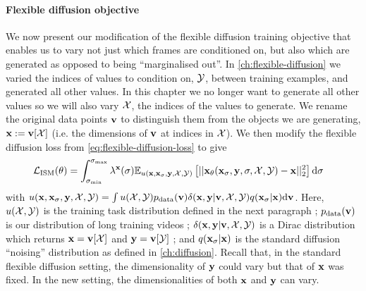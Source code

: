 \paragraph{Flexible diffusion objective}
We now present our modification of the flexible diffusion training objective that enables us to vary not just which frames are conditioned on, but also which are generated as opposed to being ``marginalised out''. In \cref{ch:flexible-diffusion} we varied the indices of values to condition on, ${\mathcal{Y}}$, between training examples, and generated all other values. In this chapter we no longer want to generate all other values so we will also vary ${\mathcal{X}}$, the indices of the values to generate. We rename the original data points ${\mathbf{v}}$ to distinguish them from the objects we are generating, ${\mathbf{x}} := {\mathbf{v}}[{\mathcal{X}}]$ (i.e. the dimensions of ${\mathbf{v}}$ at indices in ${\mathcal{X}}$). We then modify the flexible diffusion loss from \cref{eq:flexible-diffusion-loss} to give
\begin{align} \label{eq:fdm-loss}
    \mathcal{L}_\text{ISM}(\theta) &= \int_{\sigma_\text{min}}^{\sigma_\text{max}} \lambda^{\mathbf{x}}(\sigma) \mathbb{E}_{u({\mathbf{x}}, {\mathbf{x}}_\sigma, {\mathbf{y}}, {\mathcal{X}}, {\mathcal{Y}})} \left[ 
    || {\mathbf{x}}_\theta({\mathbf{x}}_\sigma, {\mathbf{y}}, \sigma, {\mathcal{X}}, {\mathcal{Y}}) - {\mathbf{x}} ||_2^2 \right] \mathrm{d}\sigma
\end{align}
with $u({\mathbf{x}}, {\mathbf{x}}_\sigma, {\mathbf{y}}, {\mathcal{X}}, {\mathcal{Y}}) = \int u({\mathcal{X}}, {\mathcal{Y}})p_{\rm{data}}({\mathbf{v}})\delta({\mathbf{x}},{\mathbf{y}}|{\mathbf{v}},{\mathcal{X}},{\mathcal{Y}})q({\mathbf{x}}_\sigma|{\mathbf{x}}) \mathrm{d}{\mathbf{v}}$. Here, $u({\mathcal{X}}, {\mathcal{Y}})$ is the training task distribution defined in the next paragraph ; $p_{\rm{data}}({\mathbf{v}})$ is our distribution of long training videos ; $\delta({\mathbf{x}},{\mathbf{y}}|{\mathbf{v}},{\mathcal{X}},{\mathcal{Y}})$ is a Dirac distribution which returns ${\mathbf{x}} = {\mathbf{v}}[{\mathcal{X}}]$ and ${\mathbf{y}} = {\mathbf{v}}[{\mathcal{Y}}]$ ; and $q({\mathbf{x}}_\sigma | {\mathbf{x}})$ is the standard diffusion ``noising'' distribution as defined in \cref{ch:diffusion}. Recall that, in the standard flexible diffusion setting, the dimensionality of ${\mathbf{y}}$ could vary but that of ${\mathbf{x}}$ was fixed. In the new setting, the dimensionalities of both ${\mathbf{x}}$ and ${\mathbf{y}}$ can vary.

